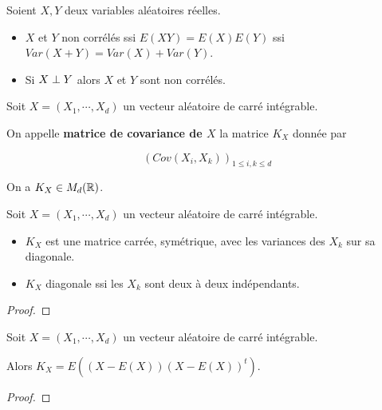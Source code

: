 \begin{remarque}
	Soient $X, Y$ deux variables aléatoires réelles.

	\begin{itemize}
		\item $X$ et $Y$ non corrélés ssi $E(XY) = E(X) E(Y)$ ssi $Var(X + Y) =
			Var(X) + Var(Y)$.
		\item Si $X \perp Y$ alors $X$ et $Y$ sont non corrélés.
	\end{itemize}
\end{remarque}

\begin{definition}
	Soit $X = (X_{1}, \cdots, X_{d})$ un vecteur aléatoire de carré intégrable.

	On appelle \textbf{matrice de covariance de $X$} la matrice $K_{X}$ donnée
	par

	\begin{equation*}
		\left( Cov(X_{i}, X_{k}) \right)_{1 \leq i, k \leq d}
	\end{equation*}

	On a $K_{X} \in M_{d}(\mathbb{R})$.
\end{definition}

\begin{proposition}
	Soit $X = (X_{1}, \cdots, X_{d})$ un vecteur aléatoire de carré intégrable.

	\begin{itemize}
		\item $K_{X}$ est une matrice carrée, symétrique, avec les variances des
			$X_{k}$ sur sa diagonale.
		\item $K_{X}$ diagonale ssi les $X_{k}$ sont deux à deux indépendants.
	\end{itemize}
\end{proposition}

\ifdefined\outputproof
\begin{proof}

\end{proof}

\begin{lemma}
	Soit $X = (X_{1}, \cdots, X_{d})$ un vecteur aléatoire de carré intégrable.

	Alors $K_{X} = E( (X - E(X)) (X - E(X))^{t})$.
\end{lemma}

\ifdefined\outputproof
\begin{proof}

\end{proof}


